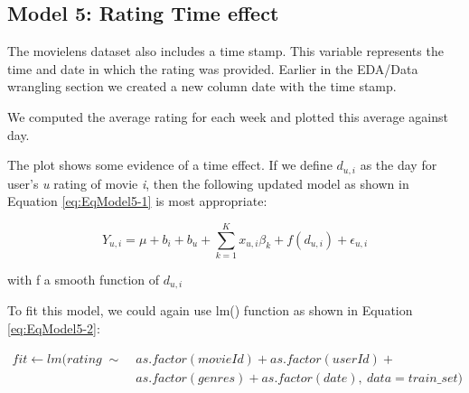 \documentclass[
]{article}
\begin{document}
\newpage

\hypertarget{model-5-rating-time-effect}{%
\subsection{Model 5: Rating Time
effect}\label{model-5-rating-time-effect}}

The movielens dataset also includes a time stamp. This variable
represents the time and date in which the rating was provided. Earlier
in the EDA/Data wrangling section we created a new column date with the
time stamp.

We computed the average rating for each week and plotted this average
against day.

The plot shows some evidence of a time effect. If we define \(d_{u,i}\)
as the day for user's \emph{u} rating of movie \emph{i}, then the
following updated model as shown in Equation \ref{eq:EqModel5-1} is most
appropriate:\\

%
\par

\label{eq:EqModel5-1} \begin{equation}
  Y_{u,i} = \mu + b_{i} + b_{u} + \sum_{k=1}^Kx_{u,i}\beta_k + f(d_{u,i}) + \epsilon_{u,i}
\end{equation}

\begin{center}
with f a smooth function of $d_{u,i}$
\end{center}

To fit this model, we could again use lm() function as shown in Equation
\ref{eq:EqModel5-2}:

%
\par

\label{eq:EqModel5-2} \begin{equation}
\begin{split}
  fit \leftarrow lm(rating \; \sim \; & as.factor(movieId) + as.factor(userId) + \\ 
  & as.factor(genres) + as.factor(date), \: data = train\_{}set)
\end{split}
\end{equation}
\end{document}
